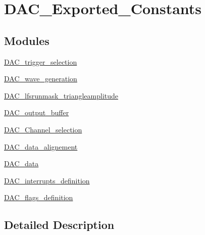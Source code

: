 \hypertarget{group___d_a_c___exported___constants}{\section{D\-A\-C\-\_\-\-Exported\-\_\-\-Constants}
\label{group___d_a_c___exported___constants}
}
\subsection*{Modules}
\begin{DoxyCompactItemize}
\item 
\hyperlink{group___d_a_c__trigger__selection}{D\-A\-C\-\_\-trigger\-\_\-selection}
\item 
\hyperlink{group___d_a_c__wave__generation}{D\-A\-C\-\_\-wave\-\_\-generation}
\item 
\hyperlink{group___d_a_c__lfsrunmask__triangleamplitude}{D\-A\-C\-\_\-lfsrunmask\-\_\-triangleamplitude}
\item 
\hyperlink{group___d_a_c__output__buffer}{D\-A\-C\-\_\-output\-\_\-buffer}
\item 
\hyperlink{group___d_a_c___channel__selection}{D\-A\-C\-\_\-\-Channel\-\_\-selection}
\item 
\hyperlink{group___d_a_c__data__alignement}{D\-A\-C\-\_\-data\-\_\-alignement}
\item 
\hyperlink{group___d_a_c__data}{D\-A\-C\-\_\-data}
\item 
\hyperlink{group___d_a_c__interrupts__definition}{D\-A\-C\-\_\-interrupts\-\_\-definition}
\item 
\hyperlink{group___d_a_c__flags__definition}{D\-A\-C\-\_\-flags\-\_\-definition}
\end{DoxyCompactItemize}


\subsection{Detailed Description}

